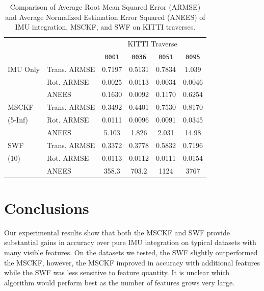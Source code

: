 \documentclass[letterpaper, 10 pt, conference]{ieeeconf}  %
\newcommand\T{\rule{0pt}{2.6ex}}        %
\newcommand\B{\rule[-1.2ex]{0pt}{0pt}} %
\begin{document}
\begin{table}
    \centering
    \caption{Comparison of Average Root Mean Squared Error (ARMSE) and Average Normalized Estimation Error Squared (ANEES) of IMU integration, MSCKF, and SWF on KITTI traverses.}
    \begin{tabular}{llcccc} 
                    &                   & \multicolumn{4}{c}{KITTI Traverse} \B      \\ \cline{3-6}
                    &                   & \texttt{0001} & \texttt{0036} & \texttt{0051} & \texttt{0095}    \T\B    \\ \hline
        IMU Only    & Trans. ARMSE      & 0.7197    & 0.5131    & 0.7834    & 1.039     \T      \\
                    & Rot. ARMSE        & 0.0025    & 0.0113    & 0.0034    & 0.0046       \\
                    & ANEES             & 0.1630    & 0.0092    & 0.1170    & 0.6254         \B      \\ \hline
        MSCKF       & Trans. ARMSE      & 0.3492    & 0.4401    & 0.7530    & 0.8170  \T      \\
        (5-Inf)     & Rot. ARMSE        & 0.0111    & 0.0096    & 0.0091    & 0.0345          \\
                    & ANEES             & 5.103     & 1.826     & 2.031     & 14.98          \B      \\ \hline
        SWF         & Trans. ARMSE      & 0.3372    & 0.3778    & 0.5832    & 0.7196  \T      \\
        (10)        & Rot. ARMSE        & 0.0113    & 0.0112    & 0.0111    & 0.0154       \\
                    & ANEES             & 358.3     & 703.2     & 1124      & 3767    \B      \\ \hline
    \end{tabular}
    \label{tab:kitti_results}
\end{table}


\section{Conclusions} \label{sec:conclusions}
Our experimental results show that both the MSCKF and SWF provide substantial gains in accuracy over pure IMU integration on typical datasets with many visible features.
On the datasets we tested, the SWF slightly outperformed the MSCKF, however, the MSCKF improved in accuracy with additional features while the SWF was less sensitive to feature quantity.
It is unclear which algorithm would perform best as the number of features grows very large.
\end{document}
